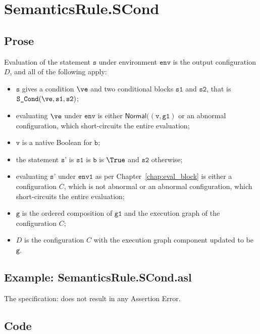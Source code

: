 \documentclass{book}
\newcommand\ProseOrAbnormal[0]{or an abnormal configuration, which short-circuits the entire evaluation}
\newcommand\Normal[0]{\textsf{Normal}}
\newcommand\env[0]{\texttt{env}}
\newcommand\envone[0]{\texttt{env1}}
\newcommand\vg[0]{\texttt{g}}
\newcommand\vv[0]{\texttt{v}}
\newcommand\vs[0]{\texttt{s}}
\newcommand\vsp[0]{\texttt{s'}}
\newcommand\vsone[0]{\texttt{s1}}
\newcommand\vstwo[0]{\texttt{s2}}
\newcommand\vgone[0]{\texttt{g1}}
\newcommand\vb[0]{\texttt{b}}
\begin{document}
\section{SemanticsRule.SCond \label{sec:SemanticsRule.SCond}}
    \subsection{Prose}
    Evaluation of the statement $\vs$ under environment $\env$ is
    the output configuration $D$, and all of the following apply:
    \begin{itemize}
    \item $\vs$ gives a condition $\ve$ and two conditional blocks $\vsone$ and $\vstwo$,
    that is $\texttt{S\_Cond}(\ve, \vsone, \vstwo)$;
    \item evaluating $\ve$ under $\env$ is either $\Normal((\vv, \vgone)$ \ProseOrAbnormal;
    \item $\vv$ is a native Boolean for $\vb$;
    \item the statement $\vsp$ is $\vsone$ is $\vb$ is $\True$ and $\vstwo$ otherwise;
    \item evaluating $\vsp$ under $\envone$ as per Chapter~\ref{chap:eval_block} is either
    a configuration $C$, which is not abnormal \ProseOrAbnormal;
    \item $\vg$ is the ordered composition of $\vgone$ and the execution graph of the configuration $C$;
    \item $D$ is the configuration $C$ with the execution graph component updated to be $\vg$.
    \end{itemize}

    \subsection{Example: SemanticsRule.SCond.asl}
    The specification:
    does not result in any Assertion Error.

  \subsection{Code}
\end{document}
